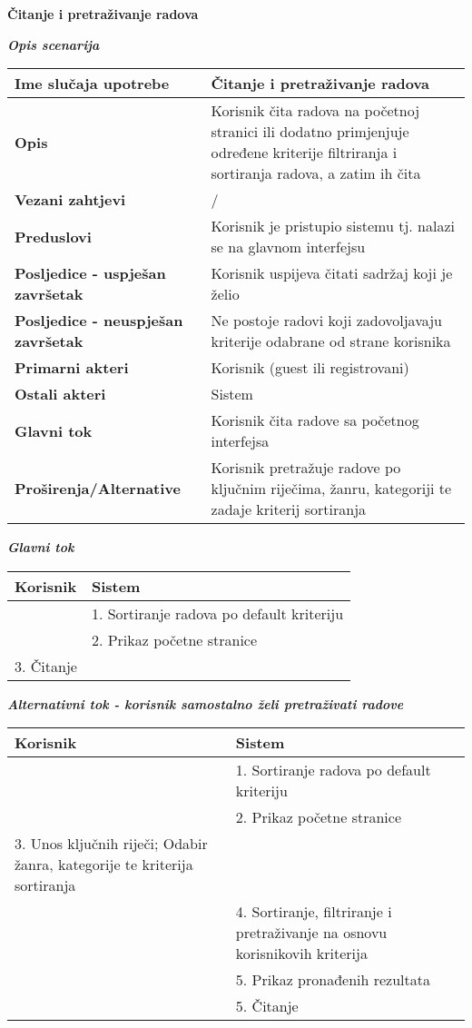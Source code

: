 \documentclass[12pt, a4paper]{report}
\begin{document}
\begin{flushleft}
{\large\textbf{Čitanje i pretraživanje radova}}  \newline

\textbf{\textit{Opis scenarija}} \\
\begin{tabular}{|m{7cm}|m{7cm}|} 
 \hline
 \textbf{Ime slučaja upotrebe} & Čitanje i pretraživanje radova \\ 
 \hline
 \textbf{Opis} & Korisnik čita radova na početnoj stranici ili dodatno primjenjuje određene kriterije filtriranja i sortiranja radova, a zatim ih čita \\ 
 \hline
 \textbf{Vezani zahtjevi} & / \\ 
 \hline
 \textbf{Preduslovi} & Korisnik je pristupio sistemu tj. nalazi se na glavnom interfejsu \\ 
 \hline
 \textbf{Posljedice - uspješan završetak} & Korisnik uspijeva čitati sadržaj koji je želio \\ 
 \hline
 \textbf{Posljedice - neuspješan završetak} & Ne postoje radovi koji zadovoljavaju kriterije odabrane od strane korisnika \\ 
 \hline
 \textbf{Primarni akteri} & Korisnik (guest ili registrovani) \\
 \hline
 \textbf{Ostali akteri} & Sistem \\ 
 \hline
 \textbf{Glavni tok} & Korisnik čita radove sa početnog interfejsa \\ 
 \hline
 \textbf{Proširenja/Alternative} & Korisnik pretražuje radove po ključnim riječima, žanru, kategoriji te zadaje kriterij sortiranja \\ 
 \hline
\end{tabular} \newpage

\textbf{\textit{Glavni tok}}
\begin{tabular}{|m{7cm}|m{7cm}|}
\hline
\textbf{Korisnik} & \textbf{Sistem} \\
\hline
 & 1. Sortiranje radova po default kriteriju \\
\hline
 & 2. Prikaz početne stranice \\
\hline
3. Čitanje &  \\
\hline
\end{tabular} \newline \newline

\textbf{\textit{Alternativni tok - korisnik samostalno želi pretraživati radove}} \\
\begin{tabular}{|m{7cm}|m{7cm}|}
\hline
\textbf{Korisnik} & \textbf{Sistem} \\
\hline
 & 1. Sortiranje radova po default kriteriju \\
\hline
 & 2. Prikaz početne stranice \\
\hline
3. Unos ključnih riječi; Odabir žanra, kategorije te kriterija sortiranja &  \\
\hline
 & 4. Sortiranje, filtriranje i pretraživanje na osnovu korisnikovih kriterija \\
\hline
 & 5. Prikaz pronađenih rezultata \\
\hline
 & 5. Čitanje \\
\hline
\end{tabular} \newpage


\end{flushleft}
\end{document}
